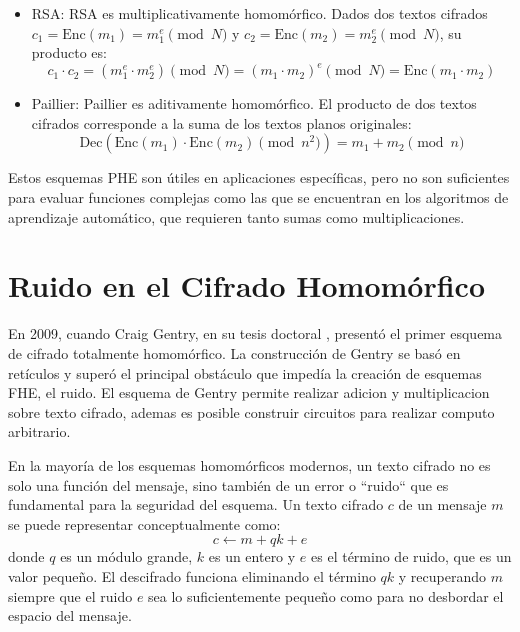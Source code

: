 \begin{itemize}
    \item RSA: RSA \cite{RSA78} es multiplicativamente homomórfico. Dados dos textos cifrados $c_1 = \text{Enc}(m_1) = m_1^e \pmod{N}$ y $c_2 = \text{Enc}(m_2) = m_2^e \pmod{N}$, su producto es:
    \begin{equation}
        c_1 \cdot c_2 = (m_1^e \cdot m_2^e) \pmod{N} = (m_1 \cdot m_2)^e \pmod{N} = \text{Enc}(m_1 \cdot m_2)
    \end{equation}
    \item Paillier: Paillier \cite{Paillier99} es aditivamente homomórfico. El producto de dos textos cifrados corresponde a la suma de los textos planos originales:
    \begin{equation}
        \text{Dec}(\text{Enc}(m_1) \cdot \text{Enc}(m_2) \pmod{n^2}) = m_1 + m_2 \pmod{n}
    \end{equation}
\end{itemize}

Estos esquemas PHE son útiles en aplicaciones específicas, pero no son suficientes para evaluar funciones complejas como las que se encuentran en los algoritmos de aprendizaje automático, que requieren tanto sumas como multiplicaciones.

\section{Ruido en el Cifrado Homomórfico}

En 2009, cuando Craig Gentry, en su tesis doctoral \cite{Gentry09}, presentó el primer esquema de cifrado totalmente homomórfico. La construcción de Gentry se basó en retículos y superó el principal obstáculo que impedía la creación de esquemas FHE, el ruido. El esquema de Gentry permite realizar adicion y multiplicacion sobre texto cifrado, ademas es posible construir circuitos para realizar computo arbitrario.

En la mayoría de los esquemas homomórficos modernos, un texto cifrado no es solo una función del mensaje, sino también de un error o ``ruido`` que es fundamental para la seguridad del esquema. Un texto cifrado $c$ de un mensaje $m$ se puede representar conceptualmente como:
\begin{equation}
    c \leftarrow m + qk + e
\end{equation}
donde $q$ es un módulo grande, $k$ es un entero y $e$ es el término de ruido, que es un valor pequeño. El descifrado funciona eliminando el término $qk$ y recuperando $m$ siempre que el ruido $e$ sea lo suficientemente pequeño como para no desbordar el espacio del mensaje.

